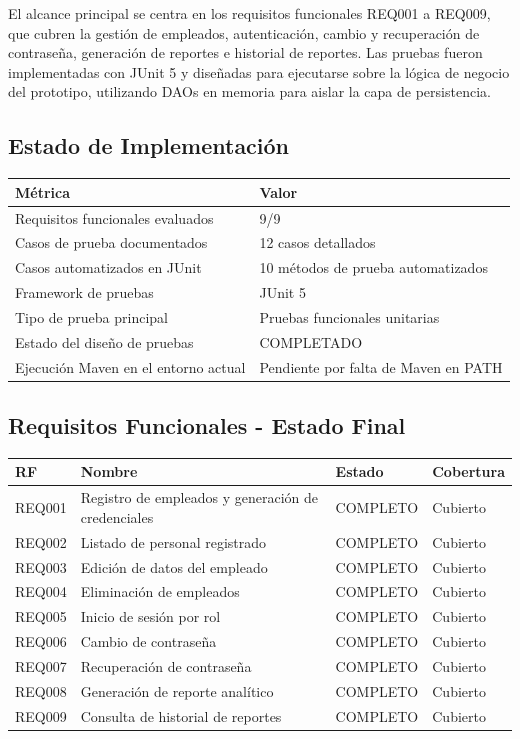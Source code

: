 \documentclass[12pt,a4paper]{article}
\begin{document}
El alcance principal se centra en los requisitos funcionales REQ001 a REQ009, que cubren la gestión de empleados, autenticación, cambio y recuperación de contraseña, generación de reportes e historial de reportes. Las pruebas fueron implementadas con JUnit 5 y diseñadas para ejecutarse sobre la lógica de negocio del prototipo, utilizando DAOs en memoria para aislar la capa de persistencia.

\subsection*{Estado de Implementación}

\begin{longtable}{|p{7cm}|p{6cm}|}
\hline
\rowcolor{grisClaro}
\textbf{Métrica} & \textbf{Valor} \\
\hline
Requisitos funcionales evaluados & 9/9 \\
\hline
Casos de prueba documentados & 12 casos detallados \\
\hline
Casos automatizados en JUnit & 10 métodos de prueba automatizados \\
\hline
Framework de pruebas & JUnit 5 \\
\hline
Tipo de prueba principal & Pruebas funcionales unitarias \\
\hline
Estado del diseño de pruebas & COMPLETADO \\
\hline
Ejecución Maven en el entorno actual & Pendiente por falta de Maven en PATH \\
\hline
\end{longtable}

\subsection*{Requisitos Funcionales - Estado Final}

\begin{longtable}{|p{1.8cm}|p{7cm}|p{2.5cm}|p{2cm}|}
\hline
\rowcolor{grisClaro}
\textbf{RF} & \textbf{Nombre} & \textbf{Estado} & \textbf{Cobertura} \\
\hline
REQ001 & Registro de empleados y generación de credenciales & COMPLETO & Cubierto \\
\hline
REQ002 & Listado de personal registrado & COMPLETO & Cubierto \\
\hline
REQ003 & Edición de datos del empleado & COMPLETO & Cubierto \\
\hline
REQ004 & Eliminación de empleados & COMPLETO & Cubierto \\
\hline
REQ005 & Inicio de sesión por rol & COMPLETO & Cubierto \\
\hline
REQ006 & Cambio de contraseña & COMPLETO & Cubierto \\
\hline
REQ007 & Recuperación de contraseña & COMPLETO & Cubierto \\
\hline
REQ008 & Generación de reporte analítico & COMPLETO & Cubierto \\
\hline
REQ009 & Consulta de historial de reportes & COMPLETO & Cubierto \\
\hline
\end{longtable}
\end{document}
